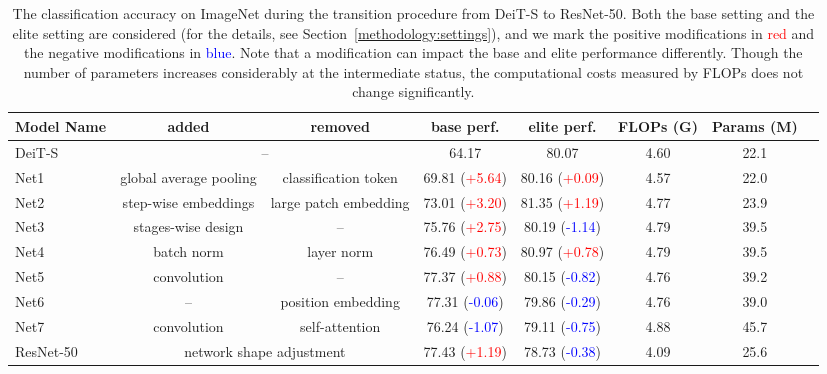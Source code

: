 \documentclass[10pt,twocolumn,letterpaper]{article}
\begin{document}
\begin{table*}
\begin{center}
\setlength{\tabcolsep}{0.12cm}
\begin{tabular}{|l|c|c|c|c|c|c|c|}
\hline
Model Name & \textbf{added} & \textbf{removed} & \textbf{base} perf. & \textbf{elite} perf. & FLOPs (G) & Params (M) \\
\hline\hline
DeiT-S & \multicolumn{2}{c|}{--} & 64.17 & 80.07 & 4.60 & 22.1\\
\hline
Net1 & global average pooling & classification token & 69.81 (\textcolor{red}{+5.64}) & 80.16 (\textcolor{red}{+0.09}) & 4.57 & 22.0 \\
Net2 & step-wise embeddings & large patch embedding & 73.01 (\textcolor{red}{+3.20}) & 81.35 (\textcolor{red}{+1.19}) & 4.77 & 23.9 \\
Net3 & stages-wise design & -- & 75.76 (\textcolor{red}{+2.75}) & 80.19 (\textcolor{blue}{-1.14}) & 4.79 &39.5\\
Net4 & batch norm & layer norm & 76.49 (\textcolor{red}{+0.73}) & 80.97 (\textcolor{red}{+0.78}) & 4.79 & 39.5\\
Net5 &  convolution & -- & 77.37 (\textcolor{red}{+0.88}) & 80.15 (\textcolor{blue}{-0.82}) &4.76 &39.2\\
Net6 & -- & position embedding & 77.31 (\textcolor{blue}{-0.06}) & 79.86 (\textcolor{blue}{-0.29}) & 4.76 & 39.0 \\
Net7 & convolution & self-attention & 76.24 (\textcolor{blue}{-1.07}) & 79.11 (\textcolor{blue}{-0.75}) & 4.88 & 45.7\\
\hline
ResNet-50 & \multicolumn{2}{c|}{network shape adjustment} & 77.43 (\textcolor{red}{+1.19}) & 78.73 (\textcolor{blue}{-0.38}) & 4.09 & 25.6\\
\hline
\end{tabular}
\end{center}
\caption{The classification accuracy on ImageNet during the transition procedure from DeiT-S to ResNet-50. Both the base setting and the elite setting are considered (for the details, see Section~\ref{methodology:settings}), and we mark the positive modifications in \textcolor{red}{red} and the negative modifications in \textcolor{blue}{blue}. Note that a modification can impact the base and elite performance differently. Though the number of parameters increases considerably at the intermediate status, the computational costs measured by FLOPs does not change significantly.}
\label{tab:transition}
\end{table*}
\end{document}
